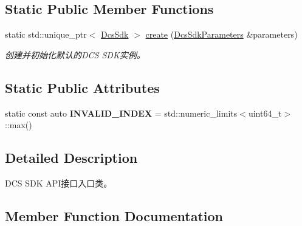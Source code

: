 \subsection*{Static Public Member Functions}
\begin{DoxyCompactItemize}
\item 
static std\+::unique\+\_\+ptr$<$ \hyperlink{classduerOSDcsSDK_1_1sdkInterfaces_1_1DcsSdk}{Dcs\+Sdk} $>$ \hyperlink{classduerOSDcsSDK_1_1sdkInterfaces_1_1DcsSdk_a265680194fb7399453e35e8833b1900c}{create} (\hyperlink{structduerOSDcsSDK_1_1sdkInterfaces_1_1DcsSdkParameters}{Dcs\+Sdk\+Parameters} \&parameters)
\begin{DoxyCompactList}\small\item\em 创建并初始化默认的\+D\+CS S\+D\+K实例。 \end{DoxyCompactList}\end{DoxyCompactItemize}
\subsection*{Static Public Attributes}
\begin{DoxyCompactItemize}
\item 
\mbox{\label{classduerOSDcsSDK_1_1sdkInterfaces_1_1DcsSdk_a5e3ba8eeefdeb069de0a614cce3f181e}} 
static const auto {\bfseries I\+N\+V\+A\+L\+I\+D\+\_\+\+I\+N\+D\+EX} = std\+::numeric\+\_\+limits$<$uint64\+\_\+t$>$\+::max()
\end{DoxyCompactItemize}


\subsection{Detailed Description}
D\+CS S\+DK A\+P\+I接口入口类。 

\subsection{Member Function Documentation}
\mbox{\label{classduerOSDcsSDK_1_1sdkInterfaces_1_1DcsSdk_ac2718d2af3100a8468fcbcf3d581d86d}} 

